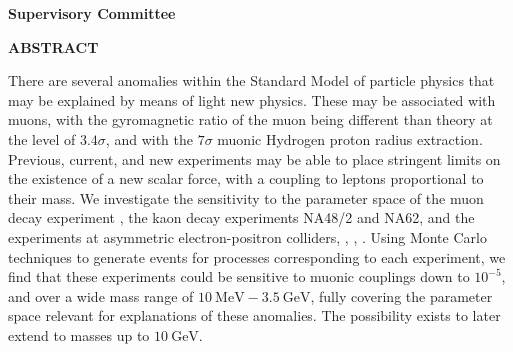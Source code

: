 \newpage
{}

\noindent \textbf{Supervisory Committee}
\tpbreak
\panel

\begin{center}
\textbf{ABSTRACT}
\end{center}

There are several anomalies within the Standard Model of particle physics that may be explained by means of light new physics.
These may be associated with muons, with the gyromagnetic ratio of the muon being different than theory at the level of $3.4\sigma$, and with the $7\sigma$ muonic Hydrogen proton radius extraction.
Previous, current, and new experiments may be able to place stringent limits on the existence of a new scalar force, with a coupling to leptons proportional to their mass.
We investigate the sensitivity to the parameter space of the muon decay experiment \mueee, the kaon decay experiments NA48/2 and NA62, and the experiments at asymmetric electron-positron colliders, \babar, \belle, \belletwo.
Using Monte Carlo techniques to generate events for processes corresponding to each experiment, we find that these experiments could be sensitive to muonic couplings down to $10^{-5}$, and over a wide mass range of $10~\textrm{MeV} - 3.5~\textrm{GeV}$, fully covering the parameter space relevant for explanations of these anomalies.
The possibility exists to later extend to masses up to $10~\textrm{GeV}$.
